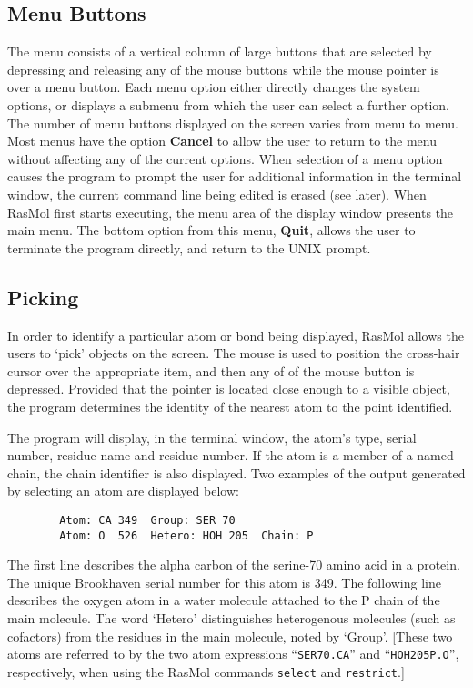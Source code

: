 \subsection{Menu Buttons}
\label{Menu}
The menu consists of a vertical column of large buttons that are selected
by depressing and releasing any of the mouse buttons while the mouse
pointer is over a menu button. Each menu option either directly changes
the system options, or displays a submenu from which the user can select a
further option. The number of menu buttons displayed on the screen varies 
from menu to menu. Most menus have the option {\bf Cancel} to allow the 
user to return to the menu without affecting any of the current options. 
When selection of a menu option causes the program to prompt the user for 
additional information in the terminal window, the current command line 
being edited is erased (see later). When RasMol first starts executing,
the menu area of the display window presents the main menu. The bottom
option from this menu, {\bf Quit}, allows the user to terminate the 
program directly, and return to the UNIX prompt.

\subsection{Picking}
\label{Picking}
In order to identify a particular atom or bond being displayed, RasMol
allows the users to `pick' objects on the screen. The mouse is used to
position the cross-hair cursor over the appropriate item, and then any of
of the mouse button is depressed. Provided that the pointer is located 
close enough to a visible object, the program determines the identity of 
the nearest atom to the point identified.

The program will display, in the terminal window, the atom's type, serial
number, residue name and residue number. If the atom is a member of a
named chain, the chain identifier is also displayed. Two examples of the
output generated by selecting an atom are displayed below:

\begin{verbatim}
        Atom: CA 349  Group: SER 70
        Atom: O  526  Hetero: HOH 205  Chain: P
\end{verbatim}

The first line describes the alpha carbon of the serine-70 amino acid in
a protein. The unique Brookhaven serial number for this atom is 349. The
following line describes the oxygen atom in a water molecule attached to the
P chain of the main molecule. The word `Hetero' distinguishes heterogenous
molecules (such as cofactors) from the residues in the main molecule, noted
by `Group'. [These two atoms are referred to by the two atom expressions 
``{\tt SER70.CA}'' and ``{\tt HOH205P.O}'', respectively, when using the 
RasMol commands {\tt select} and {\tt restrict}.]

